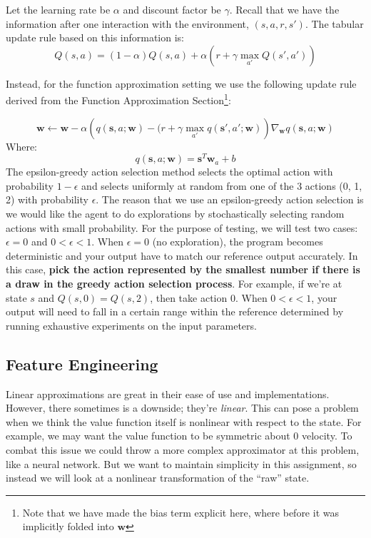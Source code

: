 \documentclass[11pt,addpoints,answers]{exam}
\newcommand{\sv}{\mathbf{s}}
\newcommand{\wv}{\mathbf{w}}
\begin{document}
Let the learning rate be $\alpha$ and discount factor be $\gamma$. Recall that we have the information after one interaction with the environment, $(s, a, r, s')$. The tabular update rule based on this information is: 
\[
    Q(s,a) = (1 - \alpha) Q(s, a) + \alpha \left(r + \gamma \max_{a'} Q(s', a')\right)
\]

Instead, for the function approximation setting we use the following update rule derived from the Function Approximation Section\footnote{Note that we have made the bias term explicit here, where before it was implicitly folded into $\wv$ }:

\[
\wv \leftarrow \wv - \alpha \left(q(\sv, a; \wv) - (r + \gamma \max_{a'} q(\sv', a'; \wv)\right) \nabla_\wv q(\sv, a; \wv)
\]
Where:
\[
q(\sv,a;\wv) = \sv^T \wv_a + b
\]
The epsilon-greedy action selection method selects the optimal action with probability $1 - \epsilon$ and selects uniformly at random from one of the 3 actions (0, 1, 2) with probability $\epsilon$. The reason that we use an epsilon-greedy action selection is we would like the agent to do explorations by stochastically selecting random actions with small probability. For the purpose of testing, we will test two cases: $\epsilon = 0$ and $0 < \epsilon < 1$. When $\epsilon = 0$ (no exploration), the program becomes deterministic and your output have to match our reference output accurately. In this case, \textbf{pick the action represented by the smallest number if there is a draw in the greedy action selection process}. For example, if we're at state $s$ and $Q(s, 0) = Q(s, 2)$, then take action $0$. When $0 < \epsilon < 1$, your output will need to fall in a certain range within the reference determined by running exhaustive experiments on the input parameters.


\subsection{Feature Engineering}
Linear approximations are great in their ease of use and implementations. However, there sometimes is a downside; they're \emph{linear}. This can pose a problem when we think the value function itself is nonlinear with respect to the state. For example, we may want the value function to be symmetric about 0 velocity. To combat this issue we could throw a more complex approximator at this problem, like a neural network. But we want to maintain simplicity in this assignment, so instead we will look at a nonlinear transformation of the ``raw'' state.
\end{document}
